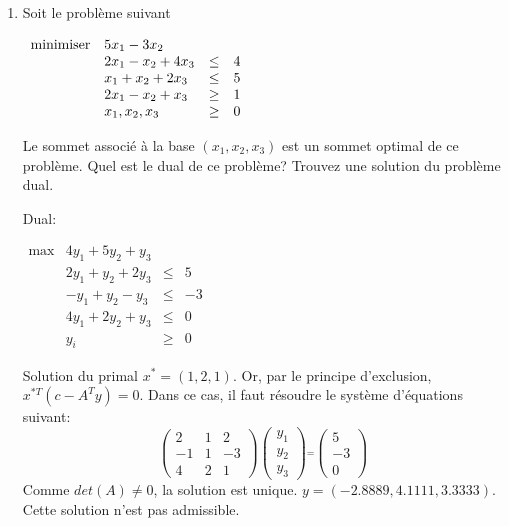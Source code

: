 \begin{enumerate}
    \begin{solution}
    \end{solution}

  \item Soit le problème suivant

    $
    \begin{array}{llcr}
      \mbox{minimiser} & 5x_1-3x_2\\
      & 2x_1-x_2 +4x_3 & \leq & 4\\
      & x_1+x_2 +2x_3 & \leq & 5\\
      & 2x_1-x_2 +x_3 & \geq & 1\\
      & x_1, x_2, x_3 & \geq & 0
    \end{array}
    $

    Le sommet associé à la base $(x_1, x_2, x_3)$ est un sommet optimal de ce problème. Quel est le dual de ce problème? Trouvez une solution du problème dual.


    \begin{solution}
      Dual:

      $
      \begin{array}{llcr}
        \max & 4y_{1} + 5y_{2} + y_{3}\\
        & 2y_{1} + y_{2}  + 2y_{3} & \leq & 5\\
        & -y_{1} + y_{2}  -y_{3} & \leq & -3\\
        & 4y_{1} + 2y_{2}  + y_{3} & \leq & 0\\
        & y_{i} & \geq & 0
      \end{array}
      $

      Solution du primal $x^{*} = (1,2,1)$.
      Or, par le principe d'exclusion, $x^{*T}(c -A^{T}y) = 0$.
      Dans ce cas, il faut résoudre le système d'équations suivant:
      \[
        \begin{pmatrix}
          2 & 1 & 2\\
          -1 & 1 & -3\\
          4 & 2 & 1
        \end{pmatrix}
        \begin{pmatrix}
          y_{1}\\
          y_{2}\\
          y_{3}
        \end{pmatrix}
        \stackrel{=}{}
        \begin{pmatrix}
          5\\
          -3\\
          0
        \end{pmatrix}
      \]
      Comme $det(A) \ne 0$, la solution est unique. $y = (-2.8889, 4.1111,3.3333)$. Cette solution n'est pas admissible.
    \end{solution}


\end{enumerate}
